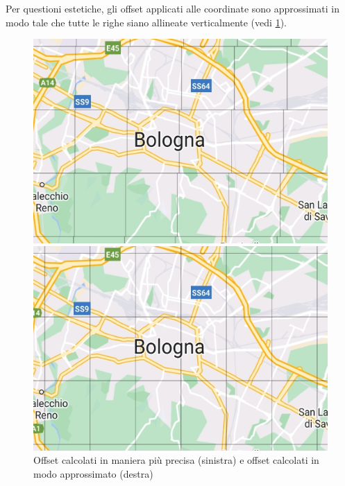 \documentclass[11pt]{article}
\begin{document}
Per questioni estetiche, gli offset applicati alle coordinate sono approssimati in modo tale che tutte le righe siano allineate verticalmente (vedi \cref{fig:tile_offset}).
\begin{figure}[h]
    \centering
    \begin{minipage}[b]{0.45\textwidth}
      \includegraphics[width=\textwidth]{./img/tile_no_approx.jpg}
    \end{minipage}
    \hfill
    \begin{minipage}[b]{0.45\textwidth}
      \includegraphics[width=\textwidth]{./img/tile_approx.jpg}
    \end{minipage}
    \caption{Offset calcolati in maniera più precisa (sinistra) e offset calcolati in modo approssimato (destra)} \label{fig:tile_offset}
\end{figure}
\end{document}
